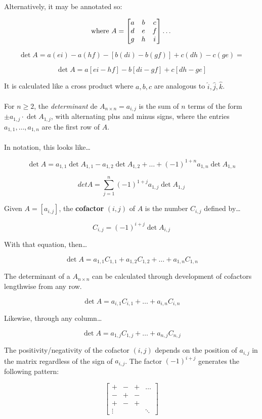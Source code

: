 \documentclass[12pt]{article}
\newcommand{\mb}{\begin{bmatrix}}
\newcommand{\me}{\end{bmatrix}}
\begin{document}
Alternatively, it may be annotated so:

$$\textrm{where } A = \mb a & b & c \\ d & e & f \\ g & h & i \me \textrm{\dots}$$

$$\det A = a(ei) - a(hf) -[b(di) - b(gf)] + c(dh) - c(ge) = $$

$$\det A = a[ei - hf] -b[di - gf] + c[dh - ge]$$

It is calculated like a cross product where $a, b, c$ are analogous to $\hat{i}, \hat{j}, \hat{k}$. \\ \\

For $n \geq 2$, the \emph{determinant} de $A_{n\times n} = a_{i,j}$ is the sum of $n$ terms of the form
$\pm a_{1,j} \cdot \det A_{1,j}$, with alternating plus and minus signs, where the entries
$a_{1,1},\dots,a_{1,n}$ are the first row of $A$. \\ \\

In notation, this looks like\dots

$$\det A = a_{1,1} \det A_{1,1} - a_{1,2} \det A_{1,2} + \dots + (-1)^{1+n}a_{1,n} \det A_{1,n}$$

$$det A = \sum_{j=1}^{n} (-1)^{1+j} a_{1,j} \det A_{1,j}$$

Given $A = [a_{i,j}]$, the \textbf{cofactor} $(i, j)$ of $A$ is the number $C_{i,j}$ defined by\dots

$$C_{i,j} = (-1)^{i+j} \det A_{i,j}$$

With that equation, then\dots

$$\det A = a_{1,1}C_{1,1} + a_{1,2}C_{1,2} + \dots + a_{1,n}C_{1,n}$$

The determinant of a $A_{n\times n}$ can be calculated through development of cofactors lengthwise from any row.

$$\det A = a_{i,1}C_{i,1} + \dots + a_{i,n}C_{i,n}$$

Likewise, through any column\dots

$$\det A = a_{1,j}C_{1,j} + \dots + a_{n,j}C_{n,j}$$

The positivity/negativity of the cofactor $(i,j)$ depends on the position of $a_{i,j}$ in the matrix regardless
of the sign of $a_{i,j}$. The factor $(-1)^{i+j}$ generates the following pattern:

$$\mb
+ & - & + & \dots \\
- & + & - \\
+ & - & + \\
\vdots & & & \ddots
\me $$
\end{document}
